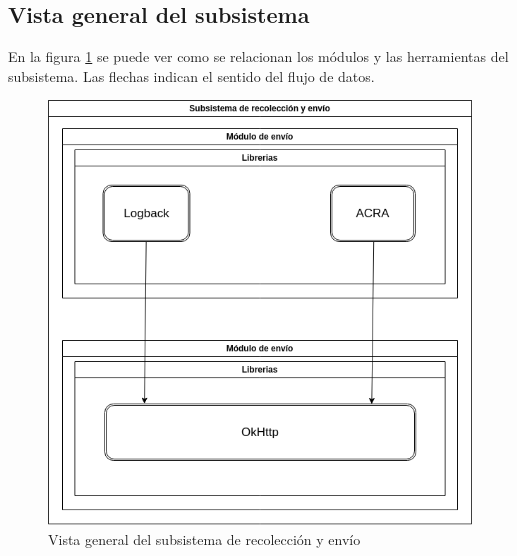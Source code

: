 \subsection{Vista general del subsistema}
En la figura \ref{fig:subrecenv} se puede ver como se relacionan los módulos y las herramientas del subsistema. Las flechas indican el sentido del flujo de datos.

\begin{figure}
	\includegraphics[width=\linewidth]{Moduloss-subrecenv.png}
	\caption{Vista general del subsistema de recolección y envío}
	\label{fig:subrecenv}
\end{figure}














